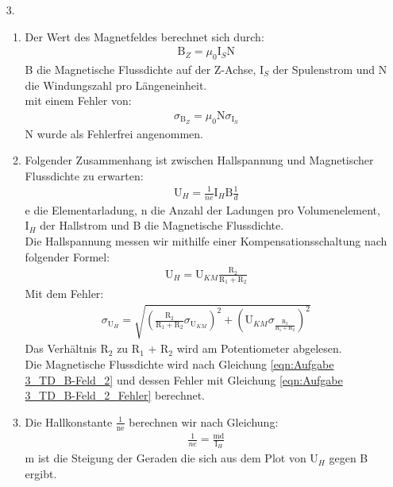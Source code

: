 \documentclass[12pt]{scrartcl}
\begin{document}
\begin{enumerate}
\item[3.]
\begin{enumerate}
\item
Der Wert des Magnetfeldes berechnet sich durch:
\begin{align}
 \text{B}_Z = \mu_0 \text{I}_S \text{N}
 \label{eqn:Aufgabe 3_TD_B-Feld_2}
\end{align}
B die Magnetische Flussdichte auf der Z-Achse, I$_S$ der Spulenstrom und N die Windungszahl pro Längeneinheit.\\
mit einem Fehler von:
\begin{align}
\sigma_{\text{B}_Z} = \mu_0 \text{N} \sigma_{\text{I}_S}
\label{eqn:Aufgabe 3_TD_B-Feld_2_Fehler}
\end{align}
N wurde als Fehlerfrei angenommen.\\
\item
Folgender Zusammenhang ist zwischen Hallspannung und Magnetischer Flussdichte zu erwarten:
\begin{align}
\text{U}_H = \frac{1}{ne} \text{I}_H \text{B} \frac{1}{d}
\label{eqn:Hallspannung}
\end{align}
e die Elementarladung, n die Anzahl der Ladungen pro Volumenelement, I$_H$ der Hallstrom und B die Magnetische Flussdichte.\\
Die Hallspannung messen wir mithilfe einer Kompensationsschaltung nach folgender Formel:
\begin{align}
\text{U}_H = \text{U}_{KM} \frac{\text{R}_2}{\text{R}_1+\text{R}_2}
\label{eqn:U_H}
\end{align}
Mit dem Fehler:
\begin{align}
\sigma_{\text{U}_H} = \sqrt{
\left(\frac{\text{R}_2}{\text{R}_1+\text{R}_2}\sigma_{\text{U}_{KM}}\right)^2+
\left(\text{U}_{KM}\sigma_{\frac{\text{R}_2}{\text{R}_1+\text{R}_2}}\right)^2}
\label{eqn:U_H_Fehler}
\end{align}
Das Verhältnis R$_2$ zu R$_1$ + R$_2$ wird am Potentiometer abgelesen.\\
Die Magnetische Flussdichte wird nach Gleichung \ref{eqn:Aufgabe 3_TD_B-Feld_2} und dessen Fehler mit Gleichung \ref{eqn:Aufgabe 3_TD_B-Feld_2_Fehler} berechnet.
\item
Die Hallkonstante $\frac{1}{\text{ne}}$ berechnen wir nach Gleichung:
\begin{align}
\frac{1}{ne} = \frac{\text{m} \text{d}}
{\text{I}_H}
\label{eqn:Hallkonstante}
\end{align}
m ist die Steigung der Geraden die sich aus dem Plot von U$_H$ gegen B ergibt.\\

\end{enumerate}
\end{enumerate}
\end{document}
